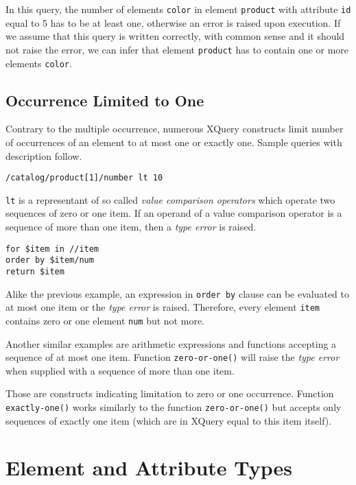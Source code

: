 In this query, the number of elements \texttt{color} in element \texttt{product} with attribute \texttt{id} equal to 5 has to be at least one, otherwise an error is raised upon execution. If we assume that this query is written correctly, with common sense and it should not raise the error, we can infer that element \texttt{product} has to contain one or more elements \texttt{color}.

\subsection{Occurrence Limited to One}
Contrary to the multiple occurrence, numerous XQuery constructs limit number of occurrences of an element to at most one or exactly one. Sample queries with description follow.

\begin{verbatim}
/catalog/product[1]/number lt 10
\end{verbatim}

\texttt{lt} is a representant of so called \emph{value comparison operators}  which operate two sequences of zero or one item. If an operand of a value comparison operator is a sequence of more than one item, then a \emph{type error}  is raised.

\begin{verbatim}
for $item in //item 
order by $item/num 
return $item
\end{verbatim}

Alike the previous example, an expression in \texttt{order by} clause can be evaluated to at most one item or the \emph{type error} is raised. Therefore, every element \texttt{item} contains zero or one element \texttt{num} but not more.

Another similar examples are arithmetic expressions and functions accepting a sequence of at most one item. Function \texttt{zero-or-one()} will raise the \emph{type error} when supplied with a sequence of more than one item.

Those are constructs indicating limitation to zero or one occurrence. Function \texttt{exactly-one()} works similarly to the function \texttt{zero-or-one()} but accepts only sequences of exactly one item (which are in XQuery equal to this item itself).

\section{Element and Attribute Types}

